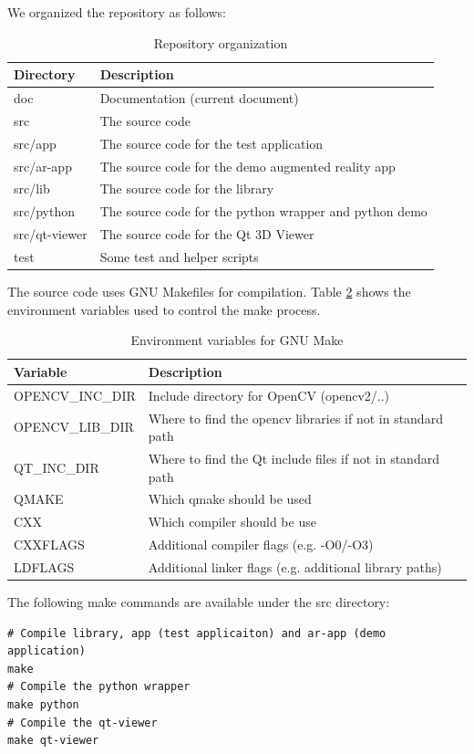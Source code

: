 \documentclass[11pt,a4paper,titlepage,oneside]{report}
\begin{document}
We organized the repository as follows:
\begin{table}[H]
  \centering
  \begin{tabular}{|l|l|}
    Directory & Description\\
    \hline
    doc & Documentation (current document)\\
    src  & The source code\\
    src/app & The source code for the test application\\
    src/ar-app & The source code for the demo augmented reality app\\
    src/lib & The source code for the library\\
    src/python & The source code for the python wrapper and python demo\\
    src/qt-viewer & The source code for the Qt 3D Viewer\\
    test & Some test and helper scripts
  \end{tabular}
\caption{Repository organization}
\label{tab:organization}
\end{table}

The source code uses GNU Makefiles for compilation. Table \ref{tab:envvars} shows the environment variables used to control the make process.
\begin{table}[H]
  \centering
  \begin{tabular}{|l|l|}
    Variable & Description\\
    \hline
    OPENCV\_INC\_DIR & Include directory for OpenCV (opencv2/..)\\
    OPENCV\_LIB\_DIR & Where to find the opencv libraries if not in standard path\\
    QT\_INC\_DIR & Where to find the Qt include files if not in standard path\\
    QMAKE & Which qmake should be used\\
    CXX & Which compiler should be use\\
    CXXFLAGS & Additional compiler flags (e.g. -O0/-O3)\\
    LDFLAGS & Additional linker flags (e.g.  additional library paths)
  \end{tabular}
\caption{Environment variables for GNU Make}
\label{tab:envvars}
\end{table}

The following make commands are available under the src directory:
\begin{lstlisting}
# Compile library, app (test applicaiton) and ar-app (demo application)
make 
# Compile the python wrapper
make python 
# Compile the qt-viewer
make qt-viewer
\end{lstlisting}
\end{document}
